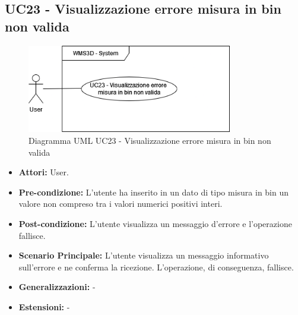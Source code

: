 \subsection{UC23 - Visualizzazione errore misura in bin non valida}
\begin{figure}[H]
  \centering
  \includegraphics[width=0.8\textwidth]{UC_diagrams_21-27/UC23.drawio.png}
   \caption{Diagramma UML UC23 - Visualizzazione errore misura in bin non valida}
\end{figure}
\begin{itemize}
    \item \textbf{Attori:} User.
    \item \textbf{Pre-condizione:}  L'utente ha inserito in un dato di tipo misura in bin un valore non compreso tra i valori numerici positivi interi.
    \item \textbf{Post-condizione:} L'utente visualizza un messaggio d'errore e l'operazione fallisce.
    \item \textbf{Scenario Principale:}  L'utente visualizza un messaggio informativo sull'errore e ne conferma la ricezione. L'operazione, di conseguenza, fallisce.
    \item \textbf{Generalizzazioni:} -
    \item \textbf{Estensioni:} -
\end{itemize}